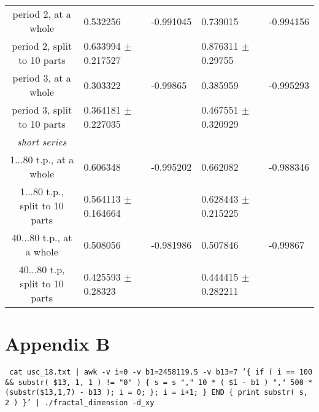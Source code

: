 \documentclass[a4paper]{article}
\begin{document}
{\begin{tabular}{cllll}
period 2, at a whole           & 0.532256                 & -0.991045   & 0.739015                 & -0.994156   \\
period 2, split to 10 parts    & 0.633994 $\pm$ 0.217527  &             & 0.876311 $\pm$ 0.29755   &             \\
period 3, at a whole           & 0.303322                 & -0.99865    & 0.385959                 & -0.995293   \\
period 3, split to 10 parts    & 0.364181 $\pm$ 0.227035  &             & 0.467551 $\pm$ 0.320929  &             \\
\textit{short series}\\
1...80 t.p., at a whole        & 0.606348                 & -0.995202   & 0.662082                 & -0.988346   \\
1...80 t.p., split to 10 parts & 0.564113 $\pm$ 0.164664  &             & 0.628443 $\pm$ 0.215225  &             \\
40...80 t.p., at a whole       & 0.508056                 & -0.981986   & 0.507846                 & -0.99867   \\
40...80 t.p, split to 10 parts & 0.425593 $\pm$ 0.28323   &             & 0.444415 $\pm$ 0.282211  &             \\
\hline
\end{tabular}
}


\newpage
\section*{Appendix B}


\texttt{\small{ cat usc\_18.txt | awk -v i=0 -v b1=2458119.5 -v b13=7 '\{ if ( i == 100 \&\& substr( \$13, 1, 1 ) != "0" ) \{ s = s "," 10 * ( \$1 - b1 ) "," 500 * (substr(\$13,1,7) - b13 ); i = 0; \}; i = i+1; \} END \{ print substr( s, 2 ) \}' | ./fractal\_dimension -d\_xy }}


\end{document}
